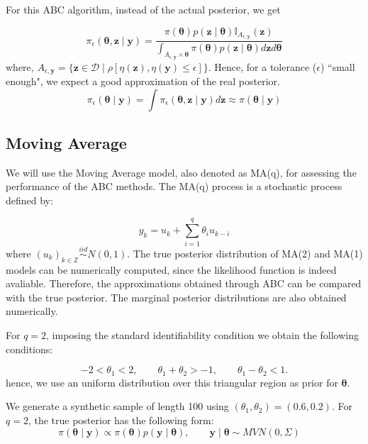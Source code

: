 \documentclass[runningheads]{llncs}
\begin{document}
For this ABC algorithm, instead of the actual posterior,
we get

\begin{equation}
\pi_\epsilon(\bm \theta, \bm z \mid \bm y) = 
\frac{\pi(\bm \theta) p(\bm z \mid \bm \theta)
\mathbb I_{A_{\epsilon,\bm y}}(\bm z)}
{\int_{A_{\epsilon,\bm y}\times \bm\theta}\pi(\bm \theta)
p(\bm z \mid \bm \theta)d\bm z d \bm \theta}
\end{equation}
where, $A_{\epsilon,\bm y} = \{
\bm z \in \mathcal D \mid \rho[\eta(\bm z), \eta(\bm y) \leq \epsilon]
\}$.
Hence, for a tolerance ($\epsilon$) ``small enough", we expect a good
approximation of the real posterior.
\begin{equation}
\pi_\epsilon(\bm \theta \mid \bm y) = 
\int \pi_\epsilon(\bm \theta, \bm z \mid \bm y) d \bm z \approx
\pi(\bm \theta \mid \bm y)
\end{equation}


\subsection{Moving Average} \label{subsec:statistical-summaries}

We will use the Moving Average model, also denoted as MA(q),
for assessing the performance of the ABC methods. The MA(q) process
is a stochastic process defined by:

\begin{equation}
y_k = u_k + \sum_{i=1}^q \theta_i u_{k-i}
\end{equation}
where $(u_k)_{k \in \mathbb Z} \overset{iid}{\sim} N(0,1)$.
The true posterior distribution of MA(2) and MA(1) models can be
numerically computed, since the likelihood function is indeed avaliable.
Therefore, the approximations obtained through ABC can be compared with
the true posterior. The marginal posterior distributions are also
obtained numerically.

For $q=2$, imposing the standard identifiability condition
we obtain the following conditions:

\begin{equation}
-2 < \theta_1 < 2, \quad \quad \theta_1+\theta_2 > -1, \quad \quad
\theta_1 - \theta_2 < 1.
\end{equation}
hence, we use an uniform distribution over this triangular region as
prior for $\bm \theta$.

We generate a synthetic sample of length 100 using
$(\theta_1, \theta_2) = (0.6, 0.2)$. For $q=2$, the 
true posterior has the following form:
\begin{equation}
\pi(\bm\theta \mid \bm y) \propto \pi(\bm\theta)
p(\bm y \mid \bm \theta), \quad \quad
\bm y \mid \bm \theta \sim MVN(0, \Sigma) \quad
\end{equation}
\end{document}
